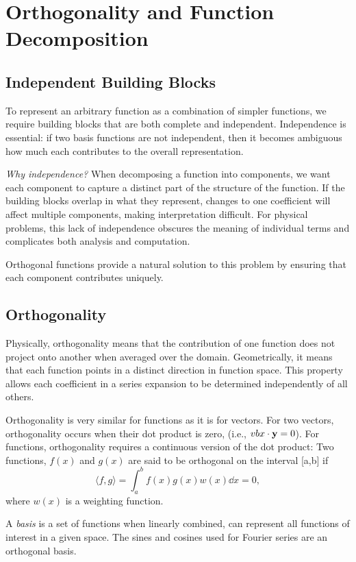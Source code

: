\section{Orthogonality and Function Decomposition}

\subsection{Independent Building Blocks}

To represent an arbitrary function as a combination of simpler functions, we require building blocks that are both complete and independent. Independence is essential: if two basis functions are not independent, then it becomes ambiguous how much each contributes to the overall representation.

\emph{Why independence?} When decomposing a function into components, we want each component to capture a distinct part of the structure of the function. If the building blocks overlap in what they represent, changes to one coefficient will affect multiple components, making interpretation difficult. For physical problems, this lack of independence obscures the meaning of individual terms and complicates both analysis and computation.

Orthogonal functions provide a natural solution to this problem by ensuring that each component contributes uniquely.

\subsection{Orthogonality}
Physically, orthogonality means that the contribution of one function does not project onto another when averaged over the domain. Geometrically, it means that each function points in a distinct direction in function space. This property allows each coefficient in a series expansion to be determined independently of all others.

Orthogonality is very similar for functions as it is for vectors.  For two vectors, orthogonality occurs when their dot product is zero, (i.e., $vb{x} \cdot \vb{y} = 0$).  For functions, orthogonality requires a continuous version of the dot product:
Two functions, $f(x)$ and $g(x)$ are said to be orthogonal on the interval [a,b] if
\[
    \langle f, g \rangle = \int_a^{b} f(x) g(x) w(x) \dd{x} = 0,
\]
where $w(x)$ is a weighting function.

A \emph{basis} is a set of functions when linearly combined, can represent all functions of interest in a given space.  The sines and cosines used for Fourier series are an orthogonal basis.

